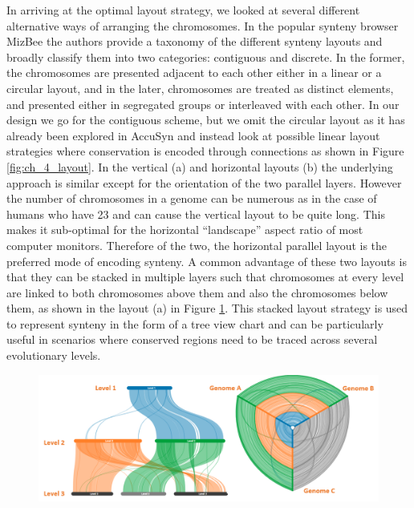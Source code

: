 In arriving at the optimal layout strategy, we looked at several different alternative ways of arranging the chromosomes. In the popular synteny browser MizBee\cite{Meyer2009} the authors provide a taxonomy of the different synteny layouts and broadly classify them into two categories: contiguous and discrete. In the former, the chromosomes are presented adjacent to each other either in a linear or a circular layout, and in the later, chromosomes are treated as distinct elements, and presented either in segregated groups or interleaved with each other. In our design we go for the contiguous scheme, but we omit the circular layout as it has already been explored in AccuSyn\cite{accusyn}  and instead look at possible linear layout strategies where conservation is encoded through connections as shown in Figure \ref{fig:ch_4_layout}. In the vertical (a) and horizontal layouts (b) the underlying approach is similar except for the orientation of the two parallel layers. However the number of chromosomes in a genome can be numerous as in the case of humans who have 23 and can cause the vertical layout to be quite long. This makes it sub-optimal for the horizontal ``landscape'' aspect ratio of most computer monitors. Therefore of the two, the horizontal parallel layout is the preferred mode of encoding synteny. A common advantage of these two layouts is that they can be stacked in multiple layers such that chromosomes at every level are linked to both chromosomes above them and also the chromosomes below them, as shown in the layout (a) in Figure \ref{fig:ch_4_layout_multi}. This stacked layout strategy is used to represent synteny in the form of a tree view chart and can be particularly useful in scenarios where conserved regions need to be traced across several evolutionary levels.

\begin{figure}[ht]
  \centering
  \includegraphics[width=.95\linewidth]{images/ch_4_layout_multi.PNG}
  \label{fig:ch_4_layout_multi}
\end{figure}

